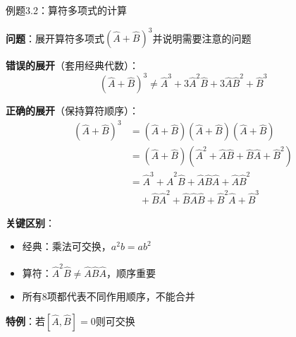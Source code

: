 \documentclass[aspectratio=169, 10pt]{beamer}
\begin{document}
\begin{frame}{例题3.2：算符多项式的计算}
  

  \textbf{问题}：展开算符多项式$(\hat{A}+\hat{B})^3$并说明需要注意的问题

  \iqbsep

  \begin{iqbitemize}
    \item \textbf{错误的展开}（套用经典代数）：
    \[
      (\hat{A}+\hat{B})^3 \neq \hat{A}^3 + 3\hat{A}^2\hat{B} + 3\hat{A}\hat{B}^2 + \hat{B}^3
    \]

    \item \textbf{正确的展开}（保持算符顺序）：
    \begin{align*}
      (\hat{A}+\hat{B})^3 &= (\hat{A}+\hat{B})(\hat{A}+\hat{B})(\hat{A}+\hat{B}) \\
      &= (\hat{A}+\hat{B})(\hat{A}^2 + \hat{A}\hat{B} + \hat{B}\hat{A} + \hat{B}^2) \\
      &= \hat{A}^3 + \hat{A}^2\hat{B} + \hat{A}\hat{B}\hat{A} + \hat{A}\hat{B}^2 \\
      &\quad + \hat{B}\hat{A}^2 + \hat{B}\hat{A}\hat{B} + \hat{B}^2\hat{A} + \hat{B}^3
    \end{align*}

    \item \textbf{关键区别}：
    \begin{itemize}
      \setlength{\itemsep}{0.05cm}
      \item 经典：乘法可交换，$a^2b = ab^2$
      \item 算符：$\hat{A}^2\hat{B} \neq \hat{A}\hat{B}\hat{A}$，顺序重要
      \item 所有8项都代表不同作用顺序，不能合并
    \end{itemize}

    \item \textbf{特例}：若$[\hat{A},\hat{B}]=0$则可交换
  \end{iqbitemize}

\end{frame}

\end{document}
